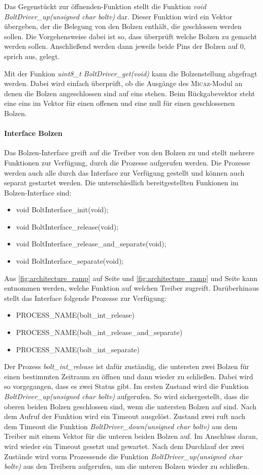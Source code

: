 Das Gegenstückt zur öffnenden-Funktion stellt die Funktion \textit{void BoltDriver\_up(unsigned char boltv)} dar. Dieser Funktion wird ein Vektor übergeben, der die Belegung von den Bolzen enthält, die geschlossen werden sollen. Die Vorgehensweise dabei ist so, dass überprüft welche Bolzen zu gemacht werden sollen. Anschließend werden dann jeweils beide Pins der Bolzen auf 0, sprich aus, gelegt.

Mit der Funkion \textit{uint8\_t BoltDriver\_get(void)} kann die Bolzenstellung abgefragt werden. Dabei wird einfach überprüft, ob die Ausgänge des \textsc{Mica}z-Modul an denen die Bolzen angeschlossen sind auf eins stehen. Beim Rückgabevektor steht eine eins im Vektor für einen offenen und eine null für einen geschlossenen Bolzen.

\paragraph{Interface Bolzen}
Das Bolzen-Interface greift auf die Treiber von den Bolzen zu und stellt mehrere Funktionen zur Verfügung, durch die Prozesse aufgerufen werden. Die Prozesse werden auch alle durch das Interface zur Verfügung gestellt und können auch separat gestartet werden. Die unterschiedlich bereitgestellten Funkionen im Bolzen-Interface sind:
\begin{itemize}
  \item void BoltInterface\_init(void);
  \item void BoltInterface\_release(void);
  \item void BoltInterface\_release\_and\_separate(void);
  \item void BoltInterface\_separate(void);
\end{itemize}
Aus \autoref{fig:architecture_ramp} auf Seite \pageref{fig:architecture_ramp} und \autoref{fig:architecture_ramp} und Seite \pageref{fig:architecture_ramp} kann entnommen werden, welche Funktion auf welchen Treiber zugreift. Darüberhinaus stellt das Interface folgende Prozesse zur Verfügung:
\begin{itemize}
  \item PROCESS\_NAME(bolt\_int\_release)
  \item PROCESS\_NAME(bolt\_int\_release\_and\_separate)
  \item PROCESS\_NAME(bolt\_int\_separate)
\end{itemize}
Der Prozess \textit{bolt\_int\_release} ist dafür zuständig, die untersten zwei Bolzen für einen bestimmten Zeitraum zu öffnen und dann wieder zu schließen. Dabei wird so vorgegangen, dass es zwei Status gibt. Im ersten Zustand wird die Funktion \textit{BoltDriver\_up(unsigned char boltv)} aufgerufen. So wird sichergestellt, dass die oberen beiden Bolzen geschlossen sind, wenn die untersten Bolzen auf sind. Nach dem Aufruf der Funktion wird ein Timeout ausgelöst. Zustand zwei ruft nach dem Timeout die Funktion \textit{BoltDriver\_down(unsigned char boltv)} aus dem Treiber mit einem Vektor für die unteren beiden Bolzen auf. Im Anschluss daran, wird wieder ein Timeout gesetzt und gewartet. Nach dem Durchlauf der zwei Zustände wird vorm Prozessende die Funktion \textit{BoltDriver\_up(unsigned char boltv)} aus den Treibern aufgerufen, um die unteren Bolzen wieder zu schließen.

